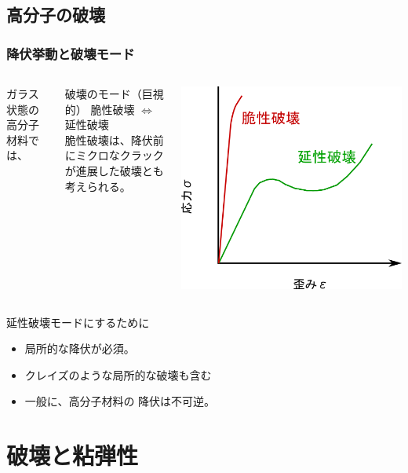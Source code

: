 \documentclass[11pt, dvipdfmx]{beamer}
\begin{document}
\subsection{高分子の破壊}
\begin{frame}
\frametitle{降伏挙動と破壊モード}
\begin{columns}[totalwidth=1\textwidth]
ガラス状態の高分子材料では、
\begin{block}{破壊のモード（巨視的）}
脆性破壊 $\Leftrightarrow$ 延性破壊\\
脆性破壊は、降伏前にミクロなクラックが進展した破壊とも考えられる。
\end{block}
	\centering
	\includegraphics[width=.9\textwidth]{S_S_Curve_2.png}
\end{columns}
\begin{exampleblock}{延性破壊モードにするために}
	\begin{itemize}
		\item
		{\color{red} 局所的な降伏}が必須。
		\item
		クレイズのような局所的な破壊も含む
		\item 
		一般に、高分子材料の{\color{red} 降伏は不可逆}。
	\end{itemize}
\end{exampleblock}
\end{frame}




\section{破壊と粘弾性}
\end{document}
